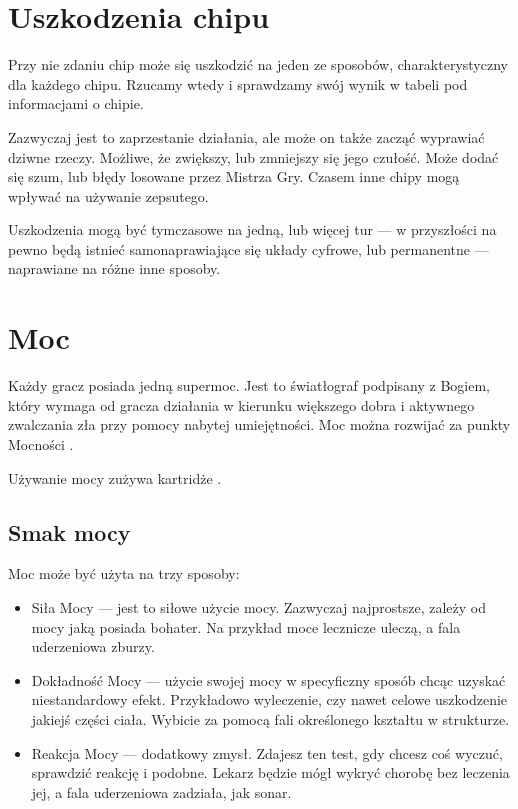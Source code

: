 \section{Uszkodzenia chipu}
Przy nie zdaniu \abnkp{} chip może się uszkodzić na jeden ze sposobów, charakterystyczny dla każdego chipu.
Rzucamy wtedy \dx{} i sprawdzamy swój wynik w tabeli pod informacjami o chipie.

Zazwyczaj jest to zaprzestanie działania, ale może on także zacząć wyprawiać dziwne rzeczy.
Możliwe, że zwiększy, lub zmniejszy się jego czułość.
Może dodać się szum, lub błędy losowane przez Mistrza Gry.
Czasem inne chipy mogą wpływać na używanie zepsutego.

Uszkodzenia mogą być tymczasowe na jedną, lub więcej tur --- w przyszłości na pewno będą istnieć samonaprawiające się układy cyfrowe, lub permanentne --- naprawiane na różne inne sposoby.

\section{Moc}
Każdy gracz posiada jedną supermoc.
Jest to światłograf podpisany z Bogiem, który wymaga od gracza działania w kierunku większego dobra i aktywnego zwalczania zła przy pomocy nabytej umiejętności.
Moc można rozwijać za punkty Mocności \xpmcn{}.

Używanie mocy zużywa kartridże \abkar{}.

\subsection{Smak mocy}
Moc może być użyta na trzy sposoby:
\begin{itemize}
 \item Siła Mocy \absm{} --- jest to siłowe użycie mocy. Zazwyczaj najprostsze, zależy od mocy jaką posiada bohater. Na przykład moce lecznicze uleczą, a fala uderzeniowa zburzy.
 \item Dokładność Mocy \abdm{} --- użycie swojej mocy w specyficzny sposób chcąc uzyskać niestandardowy efekt. Przykładowo wyleczenie, czy nawet celowe uszkodzenie jakiejś części ciała. Wybicie za pomocą fali określonego kształtu w strukturze.
 \item Reakcja Mocy \abrm{} --- dodatkowy zmysł. Zdajesz ten test, gdy chcesz coś wyczuć, sprawdzić reakcję i podobne. Lekarz będzie mógł wykryć chorobę bez leczenia jej, a fala uderzeniowa zadziała, jak sonar.
\end{itemize}

